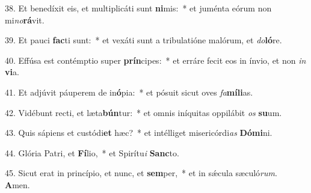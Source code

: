 38. Et benedíxit eis, et multiplicáti sunt \textbf{ni}mis:~*  et juménta eórum non mi\textit{no}\textbf{rá}vit.\

39. Et pauci \textbf{fac}ti sunt:~*  et vexáti sunt a tribulatióne malórum, et \textit{do}\textbf{ló}re.\

40. Effúsa est contémptio super \textbf{prín}cipes:~*  et erráre fecit eos in ínvio, et non \textit{in} \textbf{vi}a.\

41. Et adjúvit páuperem de in\textbf{ó}pia:~*  et pósuit sicut oves \textit{fa}\textbf{mí}\textbf{li}as.\

42. Vidébunt recti, et læta\textbf{bún}tur:~*  et omnis iníquitas oppilábit \textit{os} \textbf{su}um.\

43. Quis sápiens et custódi\textbf{et} hæc?~*  et intélliget misericórdi\textit{as} \textbf{Dó}\textbf{mi}ni.\

44. Glória Patri, et \textbf{Fí}lio,~*  et Spirítu\textit{i} \textbf{Sanc}to.\

45. Sicut erat in princípio, et nunc, et \textbf{sem}per,~*  et in sǽcula sæculó\textit{rum}. \textbf{A}men.\

